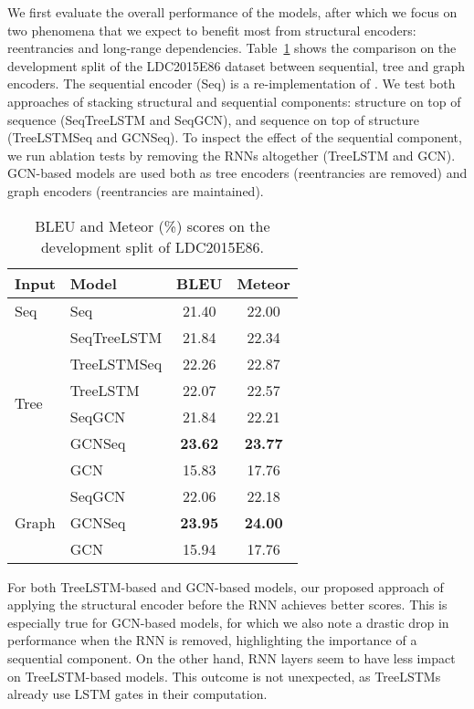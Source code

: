 \documentclass[11pt,a4paper]{article}
\begin{document}
We first evaluate the overall performance of the models, after which we focus on two phenomena that we expect to benefit most from structural encoders: reentrancies and long-range dependencies. Table~\ref{tab:dev_results} shows the comparison on the development split of the LDC2015E86 dataset between sequential, tree and graph encoders. The sequential encoder ({\sc Seq}) is a re-implementation of . We test both approaches of stacking structural and sequential components: structure on top of sequence ({\sc SeqTreeLSTM} and {\sc SeqGCN}), and sequence on top of structure ({\sc TreeLSTMSeq} and {\sc GCNSeq}). To inspect the effect of the sequential component, we run ablation tests by removing the RNNs altogether ({\sc TreeLSTM} and {\sc GCN}). GCN-based models are used both as tree encoders (reentrancies are removed) and graph encoders (reentrancies are maintained).
\begin{table}
\centering
\begin{tabular}{llcc}
\toprule
\textbf{Input} & \textbf{Model} & \textbf{BLEU} & \textbf{Meteor}\\
\midrule
Seq & {\sc Seq} & 21.40 & 22.00 \\
\midrule
\multirow{6}{*}{Tree} 
 & {\sc SeqTreeLSTM} & 21.84 & 22.34 \\
 & {\sc TreeLSTMSeq} & 22.26 & 22.87 \\
 & {\sc TreeLSTM} & 22.07 & 22.57 \\
 & {\sc SeqGCN} & 21.84 & 22.21 \\
 & {\sc GCNSeq} & \textbf{23.62} & \textbf{23.77} \\
 & {\sc GCN} & 15.83 & 17.76 \\
\midrule
\multirow{3}{*}{Graph} 
 & {\sc SeqGCN} & 22.06 & 22.18 \\
 & {\sc GCNSeq} & \textbf{23.95} & \textbf{24.00} \\
 & {\sc GCN} & 15.94 & 17.76 \\
\bottomrule
\end{tabular}
\caption{BLEU and Meteor (\%) scores on the development split of LDC2015E86.}
\label{tab:dev_results}
\end{table}

For both TreeLSTM-based and GCN-based models, our proposed approach of applying the structural encoder before the RNN achieves better scores. This is especially true for GCN-based models, for which we also note a drastic drop in performance when the RNN is removed, highlighting the importance of a sequential component. On the other hand, RNN layers seem to have less impact on TreeLSTM-based models. This outcome is not unexpected, as TreeLSTMs already use LSTM gates in their computation. 
\end{document}
